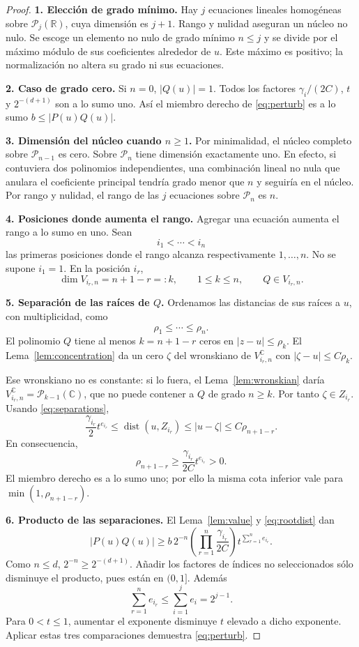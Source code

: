 \documentclass[11pt,a4paper]{article}
\numberwithin{equation}{section}
\theoremstyle{definition}
\theoremstyle{remark}
\newcommand{\R}{\mathbb R}
\newcommand{\C}{\mathbb C}
\newcommand{\PP}{\mathcal P}
\DeclareMathOperator{\dist}{dist}
\newcommand{\paso}[1]{\par\smallskip\noindent\textbf{#1}\quad}
\begin{document}
\begin{proof}
\paso{1. Elección de grado mínimo.}
Hay $j$ ecuaciones lineales homogéneas sobre $\PP_j(\R)$, cuya dimensión es $j+1$. Rango y nulidad aseguran un núcleo no nulo. Se escoge un elemento no nulo de grado mínimo $n\le j$ y se divide por el máximo módulo de sus coeficientes alrededor de $u$. Este máximo es positivo; la normalización no altera su grado ni sus ecuaciones.

\paso{2. Caso de grado cero.}
Si $n=0$, $|Q(u)|=1$. Todos los factores $\gamma_i/(2C)$, $t$ y $2^{-(d+1)}$ son a lo sumo uno. Así el miembro derecho de \eqref{eq:perturb} es a lo sumo $b\le|P(u)Q(u)|$.

\paso{3. Dimensión del núcleo cuando $n\ge1$.}
Por minimalidad, el núcleo completo sobre $\PP_{n-1}$ es cero. Sobre $\PP_n$ tiene dimensión exactamente uno. En efecto, si contuviera dos polinomios independientes, una combinación lineal no nula que anulara el coeficiente principal tendría grado menor que $n$ y seguiría en el núcleo. Por rango y nulidad, el rango de las $j$ ecuaciones sobre $\PP_n$ es $n$.

\paso{4. Posiciones donde aumenta el rango.}
Agregar una ecuación aumenta el rango a lo sumo en uno. Sean
\[
i_1<\cdots<i_n
\]
las primeras posiciones donde el rango alcanza respectivamente $1,\ldots,n$. No se supone $i_1=1$. En la posición $i_r$,
\[
\dim V_{i_r,n}=n+1-r=:k,
\qquad 1\le k\le n,
\qquad Q\in V_{i_r,n}.
\]

\paso{5. Separación de las raíces de $Q$.}
Ordenamos las distancias de sus raíces a $u$, con multiplicidad, como
\[
\rho_1\le\cdots\le\rho_n.
\]
El polinomio $Q$ tiene al menos $k=n+1-r$ ceros en $|z-u|\le\rho_k$. El Lema~\ref{lem:concentration} da un cero $\zeta$ del wronskiano de $V_{i_r,n}^{\C}$ con $|\zeta-u|\le C\rho_k$.

Ese wronskiano no es constante: si lo fuera, el Lema~\ref{lem:wronskian} daría $V_{i_r,n}^{\C}=\PP_{k-1}(\C)$, que no puede contener a $Q$ de grado $n\ge k$. Por tanto $\zeta\in Z_{i_r}$. Usando \eqref{eq:separations},
\[
\frac{\gamma_{i_r}}2t^{e_{i_r}}
\le\dist(u,Z_{i_r})\le|u-\zeta|\le C\rho_{n+1-r}.
\]
En consecuencia,
\begin{equation}\label{eq:rootdist}
\rho_{n+1-r}\ge\frac{\gamma_{i_r}}{2C}t^{e_{i_r}}>0.
\end{equation}
El miembro derecho es a lo sumo uno; por ello la misma cota inferior vale para $\min(1,\rho_{n+1-r})$.

\paso{6. Producto de las separaciones.}
El Lema~\ref{lem:value} y \eqref{eq:rootdist} dan
\[
|P(u)Q(u)|\ge b\,2^{-n}
\left(\prod_{r=1}^n\frac{\gamma_{i_r}}{2C}\right)
t^{\sum_{r=1}^ne_{i_r}}.
\]
Como $n\le d$, $2^{-n}\ge2^{-(d+1)}$. Añadir los factores de índices no seleccionados sólo disminuye el producto, pues están en $(0,1]$. Además
\[
\sum_{r=1}^ne_{i_r}\le\sum_{i=1}^je_i=2^{j-1}.
\]
Para $0<t\le1$, aumentar el exponente disminuye $t$ elevado a dicho exponente. Aplicar estas tres comparaciones demuestra \eqref{eq:perturb}.
\end{proof}
\end{document}
